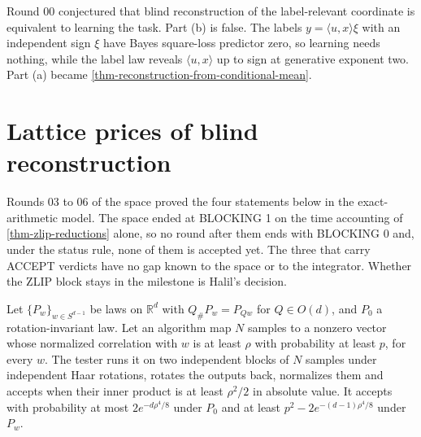 \begin{conjecture}
Round 00 conjectured that blind reconstruction of the label-relevant coordinate is
equivalent to learning the task. Part (b) is false. The labels
$y=\langle u,x\rangle\xi$ with an independent sign $\xi$ have Bayes square-loss
predictor zero, so learning needs nothing, while the label law reveals
$\langle u,x\rangle$ up to sign at generative exponent two. Part (a) became
\cref{thm-reconstruction-from-conditional-mean}.
\end{conjecture}

\section{Lattice prices of blind reconstruction}
Rounds 03 to 06 of the space proved the four statements below in the exact-arithmetic
model. The space ended at BLOCKING 1 on the time accounting of
\cref{thm-zlip-reductions} alone, so no round after them ends with BLOCKING 0 and, under
the status rule, none of them is accepted yet. The three that carry ACCEPT verdicts have
no gap known to the space or to the integrator. Whether the ZLIP block stays in the
milestone is Halil's decision.

\begin{lemma}
Let $\{P_w\}_{w\in S^{d-1}}$ be laws on $\mathbb R^d$ with $Q_\#P_w=P_{Qw}$ for
$Q\in O(d)$, and $P_0$ a rotation-invariant law. Let an algorithm map $N$ samples to a
nonzero vector whose normalized correlation with $w$ is at least $\rho$ with probability
at least $p$, for every $w$. The tester runs it on two independent blocks of $N$ samples
under independent Haar rotations, rotates the outputs back, normalizes them and accepts
when their inner product is at least $\rho^2/2$ in absolute value. It accepts with
probability at most $2e^{-d\rho^4/8}$ under $P_0$ and at least
$p^2-2e^{-(d-1)\rho^4/8}$ under $P_w$.
\end{lemma}

